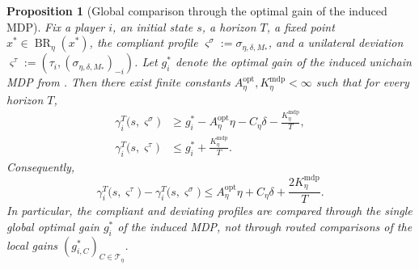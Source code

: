 \documentclass[12pt]{article}
\newtheorem{proposition}[theorem]{Proposition}
\theoremstyle{definition}
\newcommand{\1}{\mathbf{1}}
\newcommand{\cT}{\mathcal{T}}
\DeclareMathOperator{\BR}{BR}
\begin{document}
\begin{proposition}[Global comparison through the optimal gain of the induced MDP]
\label{prop:mdp-global-comparison}
Fix a player $i$, an initial state $s$, a horizon $T$, a fixed point
$x^*\in\BR_\eta(x^*)$, the compliant profile
$\varsigma^\sigma:=\sigma_{\eta,\delta,M_*}$, and a unilateral deviation
$\varsigma^\tau:=(\tau_i,(\sigma_{\eta,\delta,M_*})_{-i})$. Let $g_i^*$ denote the
optimal gain of the induced unichain MDP from .
Then there exist finite constants
$A_\eta^{\mathrm{opt}},K_\eta^{\mathrm{mdp}}<\infty$ such that for every horizon
$T$,
\begin{align*}
\gamma_i^T\bigl(s,\varsigma^\sigma\bigr)
&\ge
g_i^* - A_\eta^{\mathrm{opt}}\eta - C_\eta\delta - \frac{K_\eta^{\mathrm{mdp}}}{T},
\\
\gamma_i^T\bigl(s,\varsigma^\tau\bigr)
&\le
g_i^* + \frac{K_\eta^{\mathrm{mdp}}}{T}.
\end{align*}
Consequently,
\[
\gamma_i^T\bigl(s,\varsigma^\tau\bigr)
-
\gamma_i^T\bigl(s,\varsigma^\sigma\bigr)
\le
A_\eta^{\mathrm{opt}}\eta + C_\eta\delta + \frac{2K_\eta^{\mathrm{mdp}}}{T}.
\]
In particular, the compliant and deviating profiles are compared through the
single global optimal gain $g_i^*$ of the induced MDP, not through routed
comparisons of the local gains $(g_{i,C}^*)_{C\in\cT_\eta}$.
\end{proposition}
\end{document}

